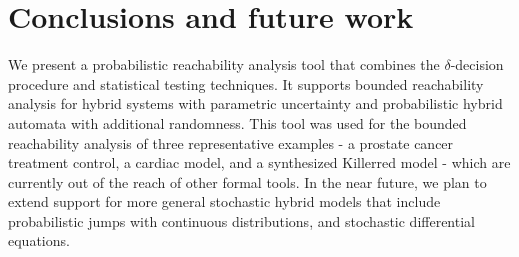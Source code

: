 \section{Conclusions and future work}
We present a probabilistic reachability analysis tool that combines the $\delta$-decision 
procedure and statistical testing techniques. 
It supports bounded reachability analysis for hybrid systems with parametric 
uncertainty and probabilistic hybrid automata with additional randomness. This tool was used for the bounded reachability analysis of three representative examples - a prostate 
cancer treatment control, a cardiac model, and a synthesized Killerred model - which are currently out of the reach of other formal tools. In the near future, we plan to extend support for more general stochastic hybrid models 
that include probabilistic jumps with continuous distributions, and stochastic differential equations.
